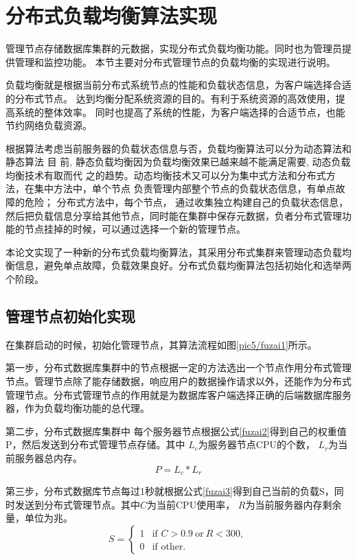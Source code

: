\section{分布式负载均衡算法实现}
管理节点存储数据库集群的元数据，实现分布式负载均衡功能。同时也为管理员提供管理和监控功能。
本节主要对分布式管理节点的负载均衡的实现进行说明。

负载均衡就是根据当前分布式系统节点的性能和负载状态信息，为客户端选择合适的分布式节点。
达到均衡分配系统资源的目的。有利于系统资源的高效使用，提高系统的整体效率。
同时也提高了系统的性能，为客户端选择的合适节点，也能节约网络负载资源。


根据算法考虑当前服务器的负载状态信息与否，负载均衡算法可以分为动态算法和静态算法
目
前, 静态负载均衡因为负载均衡效果已越来越不能满足需要, 动态负载均衡技术有取而代
之的趋势。动态均衡技术又可以分为集中式方法和分布式方法，在集中方法中，单个节点
负责管理内部整个节点的负载状态信息，有单点故障的危险；
分布式方法中，每个节点，
通过收集独立构建自己的负载状态信息，然后把负载信息分享给其他节点，同时能在集群中保存元数据，负者分布式管理功能的节点挂掉的时候，可以通过选择一个新的管理节点。

本论文实现了一种新的分布式负载均衡算法，其采用分布式集群来管理动态负载均衡信息，避免单点故障，负载效果良好。分布式负载均衡算法包括初始化和选举两个阶段。
\subsection{管理节点初始化实现}
在集群启动的时候，初始化管理节点，其算法流程如图\ref{pic5/fuzai1}所示。

第一步，分布式数据库集群中的节点根据一定的方法选出一个节点作用分布式管理节点。管理节点除了能存储数据，响应用户的数据操作请求以外，还能作为分布式管理节点。分布式管理节点的作用就是为数据库客户端选择正确的后端数据库服务器，作为负载均衡功能的总代理。

第二步，分布式数据库集群中
每个服务器节点根据公式\ref{fuzai2}得到自己的权重值P，然后发送到分布式管理节点存储。其中
$ L_c $为服务器节点CPU的个数， $ L_r $为当前服务器总内存。
\begin{equation}
P=L_c * L_r \label{fuzai2}
\end{equation}

第三步，分布式数据库节点每过1秒就根据公式\ref{fuzai3}得到自己当前的负载S，同时发送到分布式管理节点。其中$ C $为当前CPU使用率， $ R $为当前服务器内存剩余量，单位为兆。
\begin{equation}
S =
\begin{cases}
1 & \text{if } C >0.9 \: \text{or} \: R<300,\\
0 & \text{if } \text{other}.
\end{cases}   \label{fuzai3}
\end{equation}


